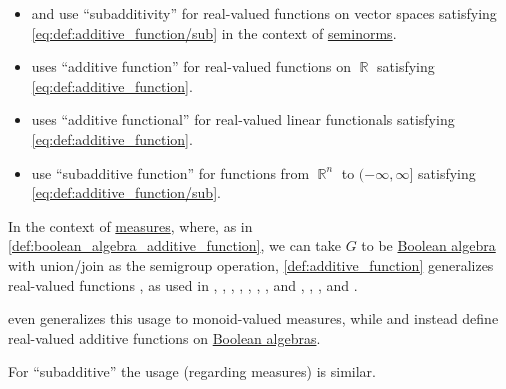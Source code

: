 \begin{remark}
\begin{itemize}
    \item {} and  use \enquote{subadditivity} for real-valued functions on vector spaces satisfying \eqref{eq:def:additive_function/sub} in the context of \hyperref[def:seminorm]{seminorms}.

    \item {} uses \enquote{additive function} for real-valued functions on \( \BbbR \) satisfying \eqref{eq:def:additive_function}.

    \item {} uses \enquote{additive functional} for real-valued linear functionals satisfying \eqref{eq:def:additive_function}.

    \item {} use \enquote{subadditive function} for functions from \( \BbbR^n \) to \( (-\infty, \infty] \) satisfying \eqref{eq:def:additive_function/sub}.
  \end{itemize}

  In the context of \hyperref[def:measure]{measures}, where, as in \cref{def:boolean_algebra_additive_function}, we can take \( G \) to be \hyperref[def:boolean_algebra]{Boolean algebra} with union/join as the semigroup operation, \cref{def:additive_function} generalizes  real-valued functions , as used in
  \cite[13]{Malliavin1995IntegrationAndProbability},
  \cite[25]{Folland1999RealAnalysis},
  \cite[7]{Cohn2013MeasureTheory},
  \cite[30]{Halmos1976MeasureTheory},
  \cite[6]{Tao2011MeasureTheory},
  \cite[71]{Yoshida1980FunctionalAnalysis},
  \cite[51]{КанторовичАкилов1984ФункциональныйАнализ},
  \cite[86]{Вулих1973ВещественныйАнализ} and
  \cite[thm. VI.2.3]{Натансон1974ВещественныйАнализ},
  \cite[15]{Боровков1999ТеорияВероятностей},
  \cite[def. 1.3.1]{Богачёв2003ОсновыТеорииМерыТом1},
  \cite[def. II.1.2]{Ширяев2007ВероятностьТом1} and
  \cite[21]{ДимитровЯнев2007ВероятностиИСтатистика}.

   even generalizes this usage to monoid-valued measures, while  and  instead define real-valued additive functions on \hyperref[def:boolean_algebra]{Boolean algebras}.

  For \enquote{subadditive} the usage (regarding measures) is similar.
\end{remark}

